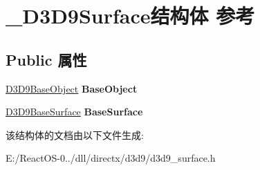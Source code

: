 \hypertarget{struct___d3_d9_surface}{}\section{\+\_\+\+D3\+D9\+Surface结构体 参考}
\label{struct___d3_d9_surface}
\subsection*{Public 属性}
\begin{DoxyCompactItemize}
\item 
\mbox{\label{struct___d3_d9_surface_a1e0be3a4a12972e356f8e1114f04a809}} 
\hyperlink{struct___d3_d9_base_object}{D3\+D9\+Base\+Object} {\bfseries Base\+Object}
\item 
\mbox{\label{struct___d3_d9_surface_a5b2d3c4d555f5db8b99a2d47fad919c9}} 
\hyperlink{struct___d3_d9_base_surface}{D3\+D9\+Base\+Surface} {\bfseries Base\+Surface}
\end{DoxyCompactItemize}


该结构体的文档由以下文件生成\+:\begin{DoxyCompactItemize}
\item 
E\+:/\+React\+O\+S-\/0../dll/directx/d3d9/d3d9\+\_\+surface.\+h\end{DoxyCompactItemize}
